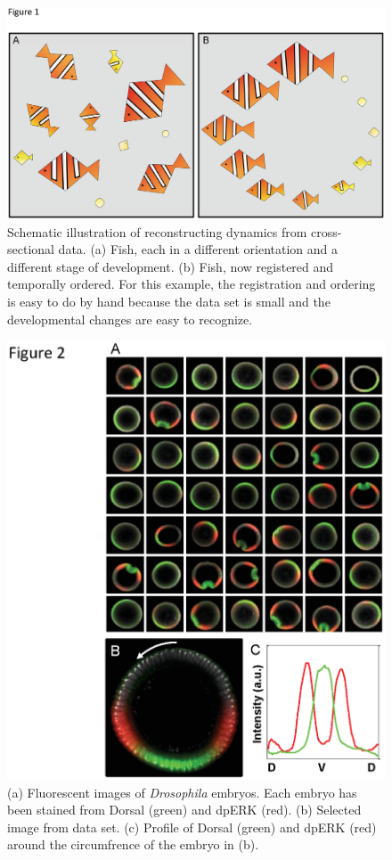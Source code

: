 \documentclass{pnastwo}
\begin{document}
\begin{figure}
\includegraphics{figures_0329_mac_1}
\caption{Schematic illustration of reconstructing dynamics from cross-sectional data. (a) Fish, each in a different orientation and a different stage of development. (b) Fish, now registered and temporally ordered. For this example, the registration and ordering is easy to do by hand because the data set is small and the developmental changes are easy to recognize.} 
\label{fig:fish}
\end{figure}

\begin{figure}
\includegraphics{figures_0329_mac_2}
\caption{(a) Fluorescent images of {\em Drosophila} embryos. Each embryo has been stained from Dorsal (green) and dpERK (red). (b) Selected image from data set. (c) Profile of Dorsal (green) and dpERK (red) around the circumfrence of the embryo in (b).}
\label{fig:images_unordered}
\end{figure}
\end{document}
